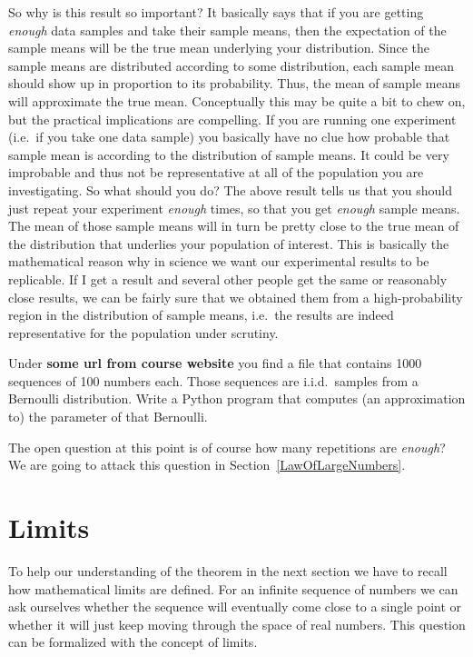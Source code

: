 So why is this result so important? It basically says that if you are getting \textit{enough} data samples and take their sample means,
then the expectation of the sample means will be the true mean underlying your distribution. Since the sample means are distributed according
to some distribution, each sample mean should show up in proportion to its probability. Thus, the mean
of sample means will approximate the true mean. Conceptually this may be quite a bit to chew on, but the practical implications are compelling.
If you are running one experiment (i.e.\ if you take one data sample) you basically have no clue how probable that sample mean is according
to the distribution of sample means. It could be very improbable and thus not be representative at all of the population you are investigating.
So what should you do? The above result tells us that you should just repeat your experiment \textit{enough} times, so that you get
\textit{enough} sample means. The mean of those sample means will in turn be pretty close to the true mean of the distribution that underlies your population
of interest. This is basically the mathematical reason why in science we want our experimental results to be replicable. If I get a result
and several other people get the same or reasonably close results, we can be fairly sure that we obtained them from a high-probability region
in the distribution of sample means, i.e.\ the results are indeed representative for the population under scrutiny.

\begin{Exercise}
Under \textbf{some url from course website} you find a file that contains 1000 sequences of 100 numbers each. Those sequences are i.i.d.\ samples from a Bernoulli distribution. Write a Python program that computes (an approximation to) the parameter of that Bernoulli.
\end{Exercise}

The open question at this point is of course how many repetitions are \textit{enough}? We are going to attack this question in Section~\ref{LawOfLargeNumbers}.

\section{Limits}
To help our understanding of the theorem in the next section we have to recall how mathematical limits are defined. For an infinite sequence of numbers we can ask ourselves whether the sequence will eventually come close to a single point or whether it will just keep moving through the space of real numbers. This
question can be formalized with the concept of limits.

